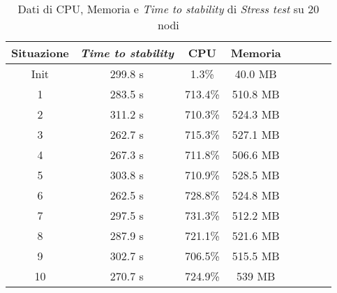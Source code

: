     \begin{table}[H]
    \caption{Dati di CPU, Memoria e \textit{Time to stability} di \textit{Stress test} su 20 nodi}
    \label{tab:st20}
    \begin{center}
        \begin{tabular}{|c|c|c|c|c|c|c|c|}
            \hline
            Situazione & \textit{Time to stability} & CPU & Memoria\\
            \hline
            Init & 299.8 s & 1.3\% & 40.0 MB\\
            1    & 283.5 s  & 713.4\% & 510.8 MB\\
            2    & 311.2 s  & 710.3\% & 524.3 MB\\
            3    & 262.7 s  & 715.3\% & 527.1 MB\\
            4    & 267.3 s  & 711.8\% & 506.6 MB\\
            5    & 303.8 s  & 710.9\% & 528.5 MB\\
            6    & 262.5 s  & 728.8\% & 524.8 MB\\
            7    & 297.5 s  & 731.3\% & 512.2 MB\\
            8    & 287.9 s  & 721.1\% & 521.6 MB\\
            9    & 302.7 s  & 706.5\% & 515.5 MB\\
            10   & 270.7 s  & 724.9\% & 539  MB\\
            \hline
        \end{tabular}
        \end{center}
    \end{table}
    
